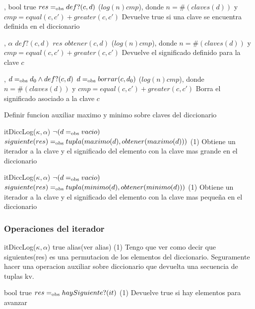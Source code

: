 {   ,
    }
{bool}
{true}
{$res =_{\mathrm{obs}} def?(c, d)$}
{\bigo($log(n)cmp$), donde $n = \#(claves(d))$ y $cmp = equal(c, c')+greater(c, c')$}
{}
{Devuelve true si una clave se encuentra definida en el diccionario}

{   ,
    }
{$\alpha$}
{$def?(c, d)$}
{$res$ \igobs $obtener(c, d)$}
{\bigo($log(n)cmp$), donde $n = \#(claves(d))$ y $cmp = equal(c, c')+greater(c, c')$}
{}
{Devuelve el significado definido para la clave $c$}

{   ,
    }
{}
{$d =_{\mathrm{obs}} d_0 \land def?(c, d)$}
{$d =_{\mathrm{obs}} borrar(c, d_0)$}
{\bigo($log(n)cmp$), donde $n = \#(claves(d))$ y $cmp = equal(c, c')+greater(c, c')$}
{}
{Borra el significado asociado a la clave $c$}


\cuidado Definir funcion auxiliar maximo y minimo sobre claves del diccionario

{   }
{itDiccLog($\kappa, \alpha$)}
{$\neg (d =_{\mathrm{obs}} vacio)$}
{$siguiente(res) =_{\mathrm{obs}} tupla(maximo(d), obtener(maximo(d)))$}
{\bigo(1)}
{}
{Obtiene un iterador a la clave y el significado del elemento con la clave 
    mas grande en el diccionario}

{   }
{itDiccLog($\kappa, \alpha$)}
{$\neg (d =_{\mathrm{obs}} vacio)$}
{$siguiente(res) =_{\mathrm{obs}} tupla(minimo(d), obtener(minimo(d)))$}
{\bigo(1)}
{}
{Obtiene un iterador a la clave y el significado del elemento con la clave 
    mas pequeña en el diccionario}



\subsubsection{Operaciones del iterador}

{   }
{itDiccLog($\kappa, \alpha$)}
{true}
{alias(\cuidado ver alias)}
{\bigo(1)}
{Tengo que ver como decir que siguientes(res)
    es una permutacion de los elementos del diccionario. Seguramente 
    hacer una operacion auxiliar sobre diccionario que devuelta una 
    secuencia de tuplas kv.}
{}

{    }
{bool}
{true}
{$res =_{\mathrm{obs}} haySiguiente?(it)$}
{\bigo(1)}
{}
{Devuelve true si hay elementos para avanzar}


